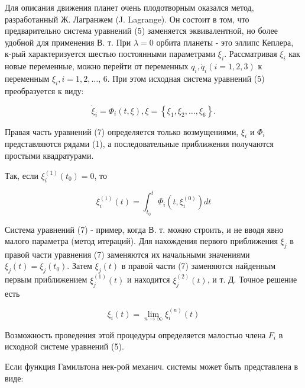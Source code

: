 \documentclass[10pt]{article}
\begin{document}
Для описания движения планет очень плодотворным оказался метод, разработанный Ж. Лагранжем (J. Lagrange). Он состоит в том, что предварительно система уравнений (5) заменяется эквивалентной, но более удобной для применения В. т. При $\lambda=0$ орбита планеты - это эллипс Кеплера, к-рый характеризуется шестью постоянными параметрами $\xi_{i}$. Рассматривая $\xi_{i}$ как новые переменные, можно перейти от переменных $q_{i}, \dot{q}_{i}(i=1,2,3)$ к переменным $\xi_{i}, i=1,2, \ldots$, 6. При этом исходная система уравнений (5) преобразуется к виду:



\[

\dot{\xi}_{i}=\Phi_{i}(t, \xi), \xi=\left\{\xi_{1}, \xi_{2}, \ldots, \xi_{6}\right\} .

\]



Правая часть уравнений (7) определяется только возмущениями, $\xi_{i}$ и $\Phi_{i}$ представляются рядами (1), а последовательные приближения получаются простыми квадратурами.



Так, если $\xi_{i}^{(1)}\left(t_{0}\right)=0$, то



\[

\xi_{i}^{(1)}(t)=\int_{t_{0}}^{t} \Phi_{i}\left(t, \xi_{i}^{(0)}\right) d t

\]



Система уравнений (7) - пример, когда В. т. можно строить, и не вводя явно малого параметра (метод итераций). Для нахождения первого приближения $\xi_{j}$ в правой части уравнения (7) заменяются их начальными значениями $\xi_{j}(t)=\xi_{j}\left(t_{0}\right)$. Затем $\xi_{j}(t)$ в правой части (7) заменяются найденным первым приближением $\xi_{j}^{(1)}(t)$ и находится $\xi_{j}^{(2)}(t)$, и т. Д. Точное решение есть



\[

\xi_{i}(t)=\lim _{n \rightarrow \infty} \xi_{i}^{(n)}(t)

\]



Возможность проведения этой процедуры определяется малостью члена $F_{i}$ в исходной системе уравнений (5).



Если функция Гамильтона нек-рой механич. системы может быть представлена в виде:
\end{document}
